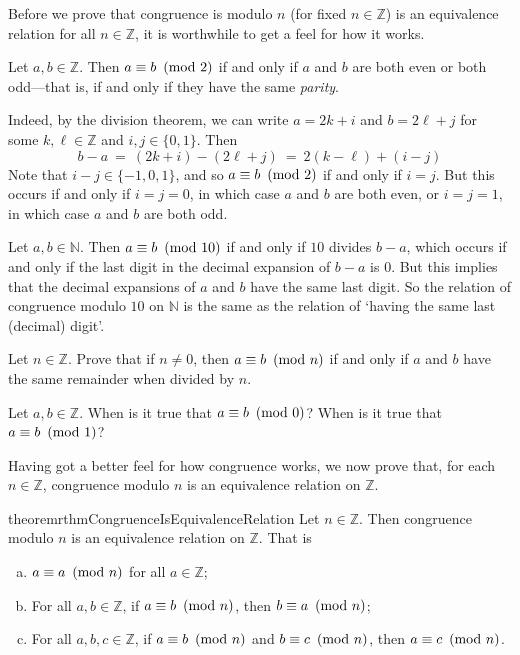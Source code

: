 Before we prove that congruence is modulo $n$ (for fixed $n \in \mathbb{Z}$) is an equivalence relation for all $n \in \mathbb{Z}$, it is worthwhile to get a feel for how it works.

\begin{example}
\label{exCongruenceModuloTwoIsSameAsParity}
Let $a,b \in \mathbb{Z}$. Then $a \equiv b ~\left(\text{mod}~2\right)$ if and only if $a$ and $b$ are both even or both odd---that is, if and only if they have the same \textit{parity}.

Indeed, by the division theorem, we can write $a=2k+i$ and $b=2\ell+j$ for some $k,\ell \in \mathbb{Z}$ and $i,j \in \{ 0,1 \}$. Then
\[ b - a ~=~ (2k+i) - (2\ell+j) ~=~ 2(k-\ell) + (i-j) \]
Note that $i-j \in \{ {-1},0,1 \}$, and so $a \equiv b ~\left(\text{mod}~2\right)$ if and only if $i=j$. But this occurs if and only if $i=j=0$, in which case $a$ and $b$ are both even, or $i=j=1$, in which case $a$ and $b$ are both odd.
\end{example}

\begin{example}
\label{exModuloTenIsSameAsLastDigit}
Let $a,b \in \mathbb{N}$. Then $a \equiv b ~\left(\text{mod}~10\right)$ if and only if $10$ divides $b-a$, which occurs if and only if the last digit in the decimal expansion of $b-a$ is $0$. But this implies that the decimal expansions of $a$ and $b$ have the same last digit. So the relation of congruence modulo $10$ on $\mathbb{N}$ is the same as the relation of `having the same last (decimal) digit'.
\end{example}

\begin{exercise}
Let $n \in \mathbb{Z}$. Prove that if $n \ne 0$, then $a \equiv b ~\left(\text{mod}~n\right)$ if and only if $a$ and $b$ have the same remainder when divided by $n$.
\end{exercise}

\begin{exercise}
Let $a,b \in \mathbb{Z}$. When is it true that $a \equiv b ~\left(\text{mod}~0\right)$? When is it true that $a \equiv b ~\left(\text{mod}~1\right)$?
\end{exercise}

Having got a better feel for how congruence works, we now prove that, for each $n \in \mathbb{Z}$, congruence modulo $n$ is an equivalence relation on $\mathbb{Z}$.

\begin{restatable}{theorem}{rthmCongruenceIsEquivalenceRelation}
\label{thmCongruenceIsEquivalenceRelation}
Let $n \in \mathbb{Z}$. Then congruence modulo $n$ is an equivalence relation on $\mathbb{Z}$. That is
\begin{enumerate}[(a)]
\item $a \equiv a ~\left(\text{mod}~n\right)$ for all $a \in \mathbb{Z}$;
\item For all $a,b \in \mathbb{Z}$, if $a \equiv b ~\left(\text{mod}~n\right)$, then $b \equiv a ~\left(\text{mod}~n\right)$;
\item For all $a,b,c \in \mathbb{Z}$, if $a \equiv b ~\left(\text{mod}~n\right)$ and $b \equiv c ~\left(\text{mod}~n\right)$, then $a \equiv c ~\left(\text{mod}~n\right)$.
\end{enumerate}
\end{restatable}

